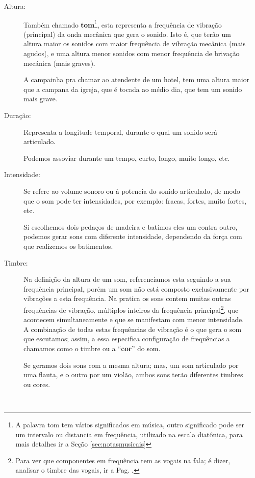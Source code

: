 \begin{description}
\item [Altura:] \label{sec:pos:Altura} 
Também chamado \textbf{tom}\footnote{A palavra tom tem vários significados em música, 
outro significado pode ser um intervalo ou distancia em frequência, 
utilizado na escala diatônica, para mais detalhes ir a Seção \ref{sec:notasmusicais}}, esta representa a frequência de vibração (principal) da onda mecânica que gera o sonido.
Isto é, que terão um altura maior os sonidos com maior frequência de vibração mecânica (mais agudos), 
e uma altura menor sonidos com menor frequência de brivação mecánica (mais graves).
\begin{example}
A campainha pra chamar ao atendente de um hotel, 
tem uma altura maior que a campana da igreja, 
que é tocada ao médio dia, que tem um sonido mais grave.
\end{example} 
\item [Duração:] \label{sec:pos:Duracion}
Representa a longitude temporal, durante o qual um sonido será articulado.
\begin{example}
Podemos assoviar durante um tempo, curto, longo, muito longo, etc.
\end{example} 
\item [Intensidade:] \label{sec:pos:Intensidade}
Se refere ao volume sonoro ou à potencia do sonido articulado, 
de modo que o som pode ter intensidades, por exemplo: fracas, fortes, muito fortes, etc.  
\begin{example}
Si escolhemos dois pedaços de madeira e batimos eles um contra outro, 
podemos gerar sons com diferente intensidade, dependendo da força com que realizemos os batimentos.
\end{example} 
\item [Timbre:] \label{sec:pos:timbre}
Na definição da altura de um som, referenciamos esta seguindo a sua frequência principal,
porém um som não está composto exclusivamente por vibrações a esta frequência.
Na pratica os sons contem muitas outras frequências de vibração, 
múltiplos inteiros da frequência principal\footnote{Para 
ver que componentes em frequência tem as vogais na fala;
é dizer, analisar o timbre das vogais, ir a Pag. \pageref{fig:timbresvocais}.}, 
que acontecem simultaneamente e 
que se manifestam com menor intensidade.
A combinação de todas estas frequências de vibração é o que gera o som que escutamos;
assim, a essa especifica configuração de frequências a chamamos como o timbre ou
a ``\textbf{cor}'' do som.
\begin{example}
Se geramos dois sons com a mesma altura; mas, um som articulado por uma flauta,
e o outro por um violão, ambos sons terão diferentes timbres ou cores.
\end{example} 
\end{description}
~\\



